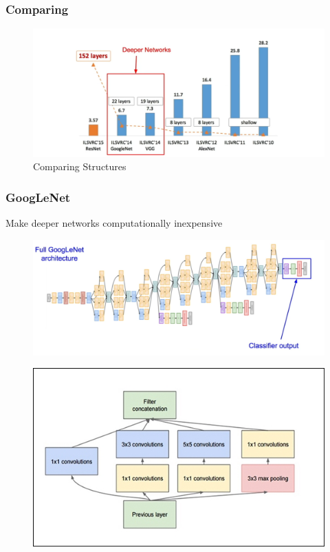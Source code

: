 \documentclass{beamer}
\begin{document}
\begin{frame}
\frametitle{Comparing}

\begin{figure}
	\includegraphics[width=\linewidth]{Pics/compare2.png}
	\caption{Comparing Structures}
\end{figure}

\end{frame}

\begin{frame}[fragile]
\frametitle{GoogLeNet}
{\color{red} Make deeper networks computationally inexpensive}
\begin{figure}
	\includegraphics[height=0.3\textheight]{Pics/googlenet.png}
\end{figure}
\begin{figure}
	\includegraphics[height=0.4\textheight]{Pics/inception.jpg}
\end{figure}
\end{frame}
\end{document}
